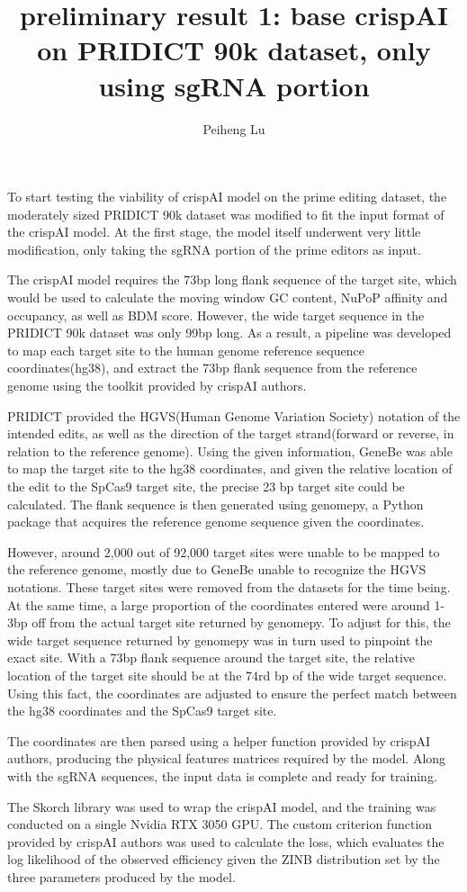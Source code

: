 \documentclass[a4,12pt]{article}
\title{preliminary result 1: base crispAI on PRIDICT 90k dataset, only using sgRNA portion}
\author{Peiheng Lu}
\date{}
\begin{document}
\maketitle

To start testing the viability of crispAI model on the prime editing dataset, the moderately sized PRIDICT 90k dataset was modified to fit the input format of the crispAI model. At the first stage, the model itself underwent very little modification, only taking the sgRNA portion of the prime editors as input. 

The crispAI model requires the 73bp long flank sequence of the target site, which would be used to calculate the moving window GC content, NuPoP affinity and occupancy, as well as BDM score\cite{stortzPiCRISPRPhysicallyInformed2023}. However, the wide target sequence in the PRIDICT 90k dataset was only 99bp long. As a result, a pipeline was developed to map each target site to the human genome reference sequence coordinates(hg38), and extract the 73bp flank sequence from the reference genome using the toolkit provided by crispAI authors.

PRIDICT provided the HGVS(Human Genome Variation Society) notation of the intended edits, as well as the direction of the target strand(forward or reverse, in relation to the reference genome). Using the given information, GeneBe was able to map the target site to the hg38 coordinates, and given the relative location of the edit to the SpCas9 target site, the precise 23 bp target site could be calculated\cite{stawinskiGenebenetImplementationValidation2024}. The flank sequence is then generated using genomepy, a Python package that acquires the reference genome sequence given the coordinates.

However, around 2,000 out of 92,000 target sites were unable to be mapped to the reference genome, mostly due to GeneBe unable to recognize the HGVS notations. These target sites were removed from the datasets for the time being. At the same time, a large proportion of the coordinates entered were around 1-3bp off from the actual target site returned by genomepy. To adjust for this, the wide target sequence returned by genomepy was in turn used to pinpoint the exact site. With a 73bp flank sequence around the target site, the relative location of the target site should be at the 74rd bp of the wide target sequence. Using this fact, the coordinates are adjusted to ensure the perfect match between the hg38 coordinates and the SpCas9 target site.

The coordinates are then parsed using a helper function provided by crispAI authors, producing the physical features matrices required by the model. Along with the sgRNA sequences, the input data is complete and ready for training.

The Skorch library was used to wrap the crispAI model, and the training was conducted on a single Nvidia RTX 3050 GPU. The custom criterion function provided by crispAI authors was used to calculate the loss, which evaluates the log likelihood of the observed efficiency given the ZINB distribution set by the three parameters produced by the model. 

\printbibliography
\end{document}

